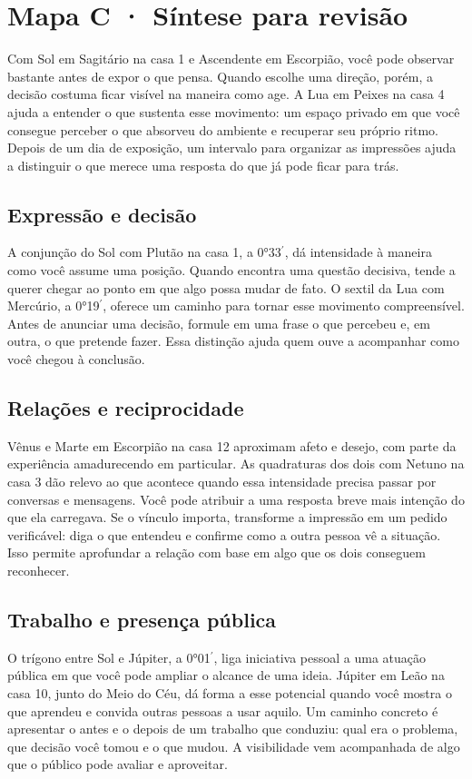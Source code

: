 \section*{Mapa C · Síntese para revisão}

Com Sol em Sagitário na casa 1 e Ascendente em Escorpião, você pode observar bastante antes de expor o que pensa. Quando escolhe uma direção, porém, a decisão costuma ficar visível na maneira como age. A Lua em Peixes na casa 4 ajuda a entender o que sustenta esse movimento: um espaço privado em que você consegue perceber o que absorveu do ambiente e recuperar seu próprio ritmo. Depois de um dia de exposição, um intervalo para organizar as impressões ajuda a distinguir o que merece uma resposta do que já pode ficar para trás.

\subsection*{Expressão e decisão}

A conjunção do Sol com Plutão na casa 1, a 0°33\ensuremath{^{\prime}}, dá intensidade à maneira como você assume uma posição. Quando encontra uma questão decisiva, tende a querer chegar ao ponto em que algo possa mudar de fato. O sextil da Lua com Mercúrio, a 0°19\ensuremath{^{\prime}}, oferece um caminho para tornar esse movimento compreensível. Antes de anunciar uma decisão, formule em uma frase o que percebeu e, em outra, o que pretende fazer. Essa distinção ajuda quem ouve a acompanhar como você chegou à conclusão.

\subsection*{Relações e reciprocidade}

Vênus e Marte em Escorpião na casa 12 aproximam afeto e desejo, com parte da experiência amadurecendo em particular. As quadraturas dos dois com Netuno na casa 3 dão relevo ao que acontece quando essa intensidade precisa passar por conversas e mensagens. Você pode atribuir a uma resposta breve mais intenção do que ela carregava. Se o vínculo importa, transforme a impressão em um pedido verificável: diga o que entendeu e confirme como a outra pessoa vê a situação. Isso permite aprofundar a relação com base em algo que os dois conseguem reconhecer.

\subsection*{Trabalho e presença pública}

O trígono entre Sol e Júpiter, a 0°01\ensuremath{^{\prime}}, liga iniciativa pessoal a uma atuação pública em que você pode ampliar o alcance de uma ideia. Júpiter em Leão na casa 10, junto do Meio do Céu, dá forma a esse potencial quando você mostra o que aprendeu e convida outras pessoas a usar aquilo. Um caminho concreto é apresentar o antes e o depois de um trabalho que conduziu: qual era o problema, que decisão você tomou e o que mudou. A visibilidade vem acompanhada de algo que o público pode avaliar e aproveitar.